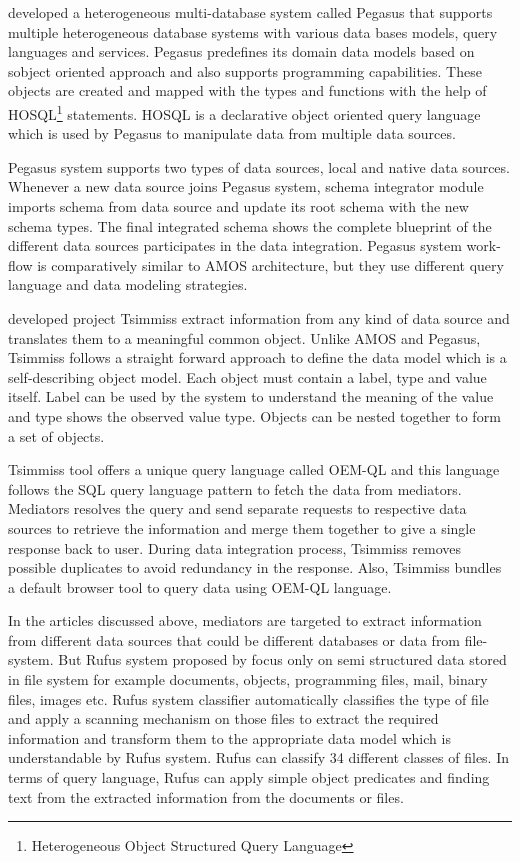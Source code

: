 \documentclass[12pt]{article}
\begin{document}
\citet{ahmed1991pegasus} developed a heterogeneous multi-database system called Pegasus that supports multiple heterogeneous database systems with various data bases models, query languages and services. Pegasus predefines its domain data models based on sobject oriented approach and also supports programming capabilities. These objects are created and mapped with the types and functions with the help of HOSQL\footnote{\label{myfootnote}Heterogeneous Object Structured Query Language} statements. HOSQL is a declarative object oriented query language which is used by Pegasus to manipulate data from multiple data sources.



Pegasus system supports two types of data sources, local and native data sources. Whenever a new data source joins Pegasus system, schema integrator module imports schema from data source and update its root schema with the new schema types. The final integrated schema shows the complete blueprint of the different data sources participates in the data integration. Pegasus system work-flow is comparatively similar to AMOS architecture, but they use different query language and data modeling strategies.

\citet{chawathe1994tsimmis} developed project Tsimmiss extract information from any kind of data source and translates them to a meaningful common object. Unlike AMOS and Pegasus, Tsimmiss follows a straight forward approach to define the data model which is a self-describing object model. Each object must contain a label, type and value itself. Label can be used by the system to understand the meaning of the value and type shows the observed value type. Objects can be nested together to form a set of objects. 

Tsimmiss tool offers a unique query language called OEM-QL and this language follows the SQL query language pattern to fetch the data from mediators. Mediators resolves the query and send separate requests to respective data sources to retrieve the information and merge them together to give a single response back to user. During data integration process, Tsimmiss removes possible duplicates to avoid redundancy in the response. Also, Tsimmiss bundles a default browser tool to query data using OEM-QL language.

In the articles discussed above, mediators are targeted to extract information from different data sources that could be different databases or data from file-system. But Rufus system proposed by \citet{shoens1993rufus} focus only on semi structured data stored in file system for example documents, objects, programming files, mail, binary files, images etc. Rufus system classifier automatically classifies the type of file and apply a scanning mechanism on those files to extract the required information and transform them to the appropriate data model which is understandable by Rufus system. Rufus can classify 34 different classes of files. In terms of query language, Rufus can apply simple object predicates and finding text from the extracted information from the documents or files.
\end{document}
